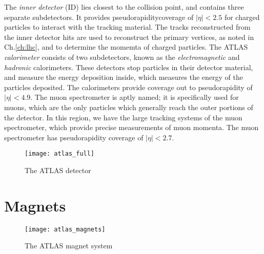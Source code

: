 The \textit{inner detector} (ID) lies closest to the collision point, and contains three separate subdetectors.
It provides pseudorapidity\footnotemark coverage of $|\eta| < 2.5$ for charged particles to interact with the tracking material.
The tracks reconstructed from the inner detector hits are used to reconstruct the primary vertices, as noted in Ch.\ref{ch:lhc}, and to determine the momemta of charged particles.
The ATLAS \textit{calorimeter} consists of two subdetectors, known as the \textit{electromagnetic} and \textit{hadronic} calorimeters.
These detectors stop particles in their detector material, and measure the energy deposition inside, which measures the energy of the particles deposited.
The calorimeters provide coverage out to pseudorapidity of $|\eta| < 4.9$.
The muon spectrometer is aptly named; it is specifically used for muons, which are the only particles which generally reach the outer portions of the detector.
In this region, we have the large tracking systems of the muon spectrometer, which provide precise measurements of muon momenta.
The muon spectrometer has pseudorapidity coverage of $|\eta| < 2.7$.

\begin{figure}
\caption{The ATLAS detector} \label{fig:atlas_full}
\texttt{[image: atlas\_full]}
\end{figure}

\section{Magnets}

\begin{figure}
\caption{The ATLAS magnet system} \label{fig:atlas_magnets}
\texttt{[image: atlas\_magnets]}
\end{figure}

